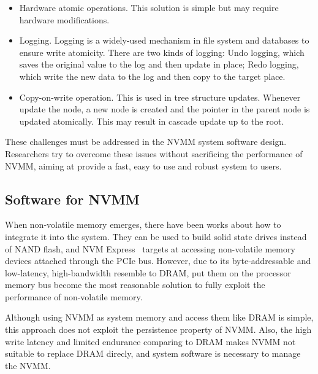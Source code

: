 \begin{itemize}
\item Hardware atomic operations. This solution is simple but may require
hardware modifications.
\item Logging. Logging is a widely-used mechanism in file system and databases
to ensure write atomicity. There are two kinds of logging: Undo logging, which
saves the original value to the log and then update in place; Redo logging,
which write the new data to the log and then copy to the target place.
\item Copy-on-write operation. This is used in tree structure updates. Whenever
update the node, a new node is created and the pointer in the parent node is
updated atomically. This may result in cascade update up to the root.
\end{itemize}

These challenges must be addressed in the NVMM system software design.
Researchers try to overcome these issues without sacrificing the performance
of NVMM, aiming at provide a fast, easy to use and robust system to users.

\subsection{Software for NVMM}
\label{sec:NVMM}


When non-volatile memory emerges, there have been works about how to
integrate it into the system. They can be used to build solid state drives
instead of NAND flash, and NVM Express~\cite{NVMe} targets at accessing
non-volatile memory devices attached through the PCIe bus. However, due to
its byte-addressable and low-latency, high-bandwidth resemble to DRAM,
put them on the processor memory bus become the most reasonable solution
to fully exploit the performance of non-volatile memory.

Although using NVMM as system memory and access them like DRAM is simple,
this approach does not exploit the persistence property of NVMM. Also, the
high write latency and limited endurance comparing to DRAM makes NVMM not
suitable to replace DRAM direcly, and system software is necessary to
manage the NVMM.

